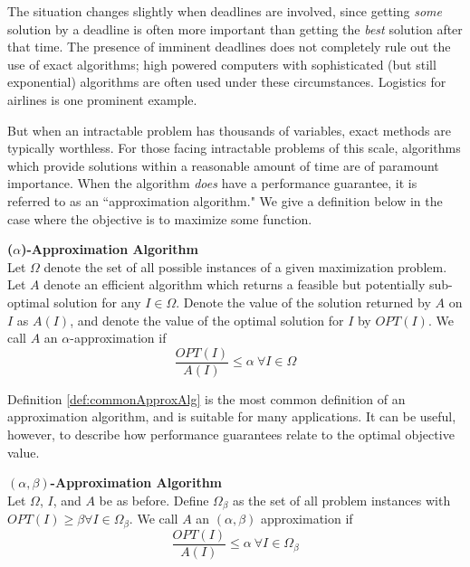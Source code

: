 The situation changes slightly when deadlines are involved, since getting \textit{some} solution by a deadline is often more important than getting the \textit{best} solution after that time. 
The presence of imminent deadlines does not completely rule out the use of exact algorithms; high powered computers with sophisticated (but still exponential) algorithms are often used under these circumstances. 
Logistics for airlines is one prominent example.

But when an intractable problem has thousands of variables, exact methods are typically worthless. 
For those facing intractable problems of this scale, algorithms which provide solutions within a reasonable amount of time are of paramount importance.  
When the algorithm \textit{does} have a performance guarantee, it is referred to as an ``approximation algorithm."
We give a definition below in the case where the objective is to maximize some function. 

\begin{definition}
\textbf{($\alpha$)-Approximation Algorithm} \\
Let $\Omega$ denote the set of all possible instances of a given maximization problem. 
Let $A$ denote an efficient algorithm which returns a feasible but potentially sub-optimal solution for any $I \in \Omega$. 
Denote the value of the solution returned by $A$ on $I$ as $A(I)$, and denote the value of the optimal solution for $I$ by $OPT(I)$. We call $A$ an $\alpha$-approximation if
\begin{equation*}
\frac{OPT(I)}{A(I)} \leq \alpha ~ \forall I \in \Omega
\end{equation*}
\label{def:commonApproxAlg}
\end{definition}

Definition \ref{def:commonApproxAlg} is the most common definition of an approximation algorithm, and is suitable for many applications. It can be useful, however, to describe how performance guarantees relate to the optimal objective value. 
\begin{definition}
\textbf{$(\alpha,\beta)$-Approximation Algorithm } \\
Let $\Omega$, $I$, and $A$ be as before. 
Define $\Omega_\beta$ as the set of all problem instances with $OPT(I) \geq \beta \forall I \in \Omega_\beta$.
We call $A$ an $(\alpha,\beta)$ approximation if 
\begin{equation*}
\frac{OPT(I)}{A(I)} \leq \alpha ~ \forall I \in \Omega_{\beta}
\end{equation*}
\label{def:twoParamApproxAlg}
\end{definition}
\newpage